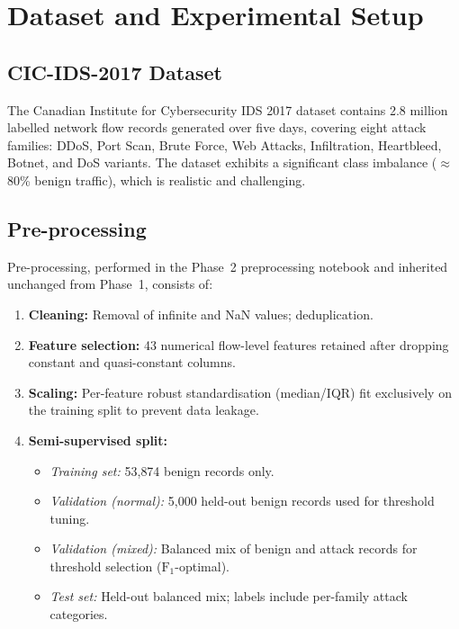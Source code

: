 \documentclass[conference]{IEEEtran}
\begin{document}
\section{Dataset and Experimental Setup}
\label{sec:dataset}

\subsection{CIC-IDS-2017 Dataset}

The Canadian Institute for Cybersecurity IDS 2017 dataset contains 2.8 million
labelled network flow records generated over five days, covering eight
attack families: DDoS, Port Scan, Brute Force, Web Attacks, Infiltration,
Heartbleed, Botnet, and DoS variants. The dataset exhibits a significant class
imbalance ($\approx$80\% benign traffic), which is realistic and challenging.

\subsection{Pre-processing}

Pre-processing, performed in the Phase~2 preprocessing notebook and inherited
unchanged from Phase~1, consists of:
\begin{enumerate}
  \item \textbf{Cleaning:} Removal of infinite and NaN values; deduplication.
  \item \textbf{Feature selection:} 43 numerical flow-level features retained
    after dropping constant and quasi-constant columns.
  \item \textbf{Scaling:} Per-feature robust standardisation (median/IQR) fit
    exclusively on the training split to prevent data leakage.
  \item \textbf{Semi-supervised split:}
    \begin{itemize}
      \item \emph{Training set:} 53{,}874 benign records only.
      \item \emph{Validation (normal):} 5{,}000 held-out benign records used
        for threshold tuning.
      \item \emph{Validation (mixed):} Balanced mix of benign and attack
        records for threshold selection ($\text{F}_{1}$-optimal).
      \item \emph{Test set:} Held-out balanced mix; labels include per-family
        attack categories.
    \end{itemize}
\end{enumerate}
\end{document}
